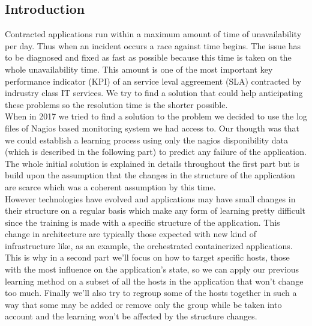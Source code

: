 \documentclass[10pt,a4paper,oneside]{article}
\begin{document}
\begin{multicols}{2}
\section{Introduction}
Contracted applications run within a maximum amount of time of unavailability per day. Thus when an incident occurs a race against time begins. The issue has to be diagnosed and fixed as fast as possible because this time is taken on the whole unavailability time. This amount is one of the most important key performance indicator (KPI) of an service leval aggreement (SLA) contracted by indrustry class IT services. We try to find a solution that could help anticipating these problems so the resolution time is the shorter possible.
\\
When in 2017 we tried to find a solution to the problem we decided to use the log files of Nagios based monitoring system we had access to. Our thougth was that we could establish a learning process using only the nagios disponibility data (which is described in the following part) to predict any failure of the application. The whole initial solution is explained in details throughout the first part but is build upon the assumption that the changes in the structure of the application are scarce which was a coherent assumption by this time.
\\ However technologies have evolved and applications may have small changes in their structure on a regular basis which make any form of learning pretty difficult since the training is made with a specific structure of the application. This change in architecture are typically those expected with new kind of infrastructure like, as an example, the orchestrated containerized applications. This is why in a second part we'll focus on how to target specific hosts, those with the most influence on the application's state, so we can apply our previous learning method on a subset of all the hosts in the application that won't change too much. Finally we'll also try to regroup some of the hosts together in such a way that some may be added or remove only the group while be taken into account and the learning won't be affected by the structure changes.
\end{multicols}
\end{document}
